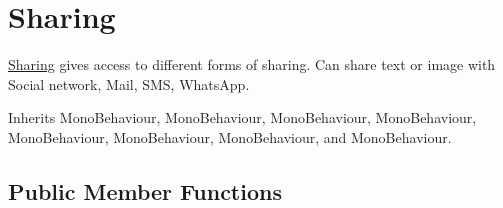 \hypertarget{class_voxel_busters_1_1_native_plugins_1_1_sharing}{}\section{Sharing}
\label{class_voxel_busters_1_1_native_plugins_1_1_sharing}


\hyperlink{class_voxel_busters_1_1_native_plugins_1_1_sharing}{Sharing} gives access to different forms of sharing. Can share text or image with Social network, Mail, S\+M\+S, Whats\+App.  




Inherits Mono\+Behaviour, Mono\+Behaviour, Mono\+Behaviour, Mono\+Behaviour, Mono\+Behaviour, Mono\+Behaviour, Mono\+Behaviour, and Mono\+Behaviour.

\subsection*{Public Member Functions}

